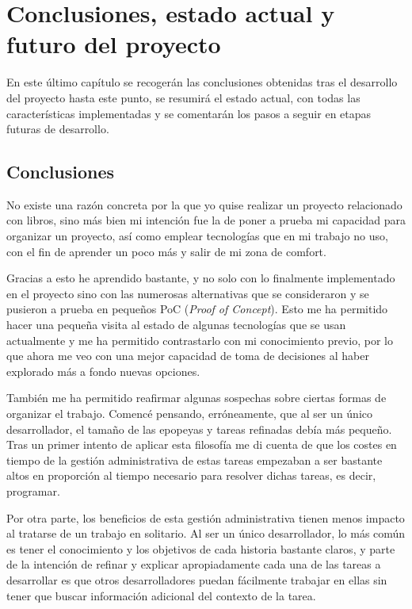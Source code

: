 \chapter{Conclusiones, estado actual y futuro del proyecto}

En este último capítulo se recogerán las conclusiones obtenidas tras el desarrollo del proyecto hasta este punto, se resumirá el estado actual, con todas las características implementadas y se comentarán los pasos a seguir en etapas futuras de desarrollo.

\section{Conclusiones}

No existe una razón concreta por la que yo quise realizar un proyecto relacionado con libros, sino más bien mi intención fue la de poner a prueba mi capacidad para organizar un proyecto, así como emplear tecnologías que en mi trabajo no uso, con el fin de aprender un poco más y salir de mi zona de comfort.

Gracias a esto he aprendido bastante, y no solo con lo finalmente implementado en el proyecto sino con las numerosas alternativas que se consideraron y se pusieron a prueba en pequeños PoC (\textit{Proof of Concept}). Esto me ha permitido hacer una pequeña visita al estado de algunas tecnologías que se usan actualmente y me ha permitido contrastarlo con mi conocimiento previo, por lo que ahora me veo con una mejor capacidad de toma de decisiones al haber explorado más a fondo nuevas opciones.

También me ha permitido reafirmar algunas sospechas sobre ciertas formas de organizar el trabajo. Comencé pensando, erróneamente, que al ser un único desarrollador, el tamaño de las epopeyas y tareas refinadas debía más pequeño. Tras un primer intento de aplicar esta filosofía me di cuenta de que los costes en tiempo de la gestión administrativa de estas tareas empezaban a ser bastante altos en proporción al tiempo necesario para resolver dichas tareas, es decir, programar.

Por otra parte, los beneficios de esta gestión administrativa tienen menos impacto al tratarse de un trabajo en solitario. Al ser un único desarrollador, lo más común es tener el conocimiento y los objetivos de cada historia bastante claros, y parte de la intención de refinar y explicar apropiadamente cada una de las tareas a desarrollar es que otros desarrolladores puedan fácilmente trabajar en ellas sin tener que buscar información adicional del contexto de la tarea.

